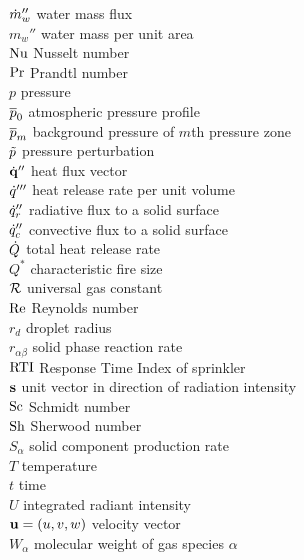\documentclass[11pt]{book}
\begin{document}
\begin{tabbing}
$\dot{m}_w''$                 \> water mass flux  \\
$m_w''$                   \> water mass per unit area \\
$\hbox{Nu}$                     \> Nusselt number \\
$\hbox{Pr}$                     \> Prandtl number \\
$p$                       \> pressure \\
$\overline{p}_0$                   \> atmospheric pressure profile \\
$\overline{p}_m$                   \> background pressure of $m$th pressure zone \\
$\tilde{p}$                     \> pressure perturbation \\
$\dot{\bf q}''$                  \> heat flux vector \\
$\dot{q}'''$                  \> heat release rate per unit volume \\
$\dot{q}_r''$                 \> radiative flux to a solid surface \\
$\dot{q}_c''$                 \> convective flux to a solid surface \\
$\dot{Q}$                     \> total heat release rate \\
$Q^*$                     \> characteristic fire size \\
${\cal R}$                      \> universal gas constant \\
$\hbox{Re}$                     \> Reynolds number \\
$r_d$                     \> droplet radius \\
$r_{\alpha\beta}$     \> solid phase reaction rate \\
$\hbox{RTI}$              \> Response Time Index of sprinkler \\
${\bf s}$                     \> unit vector in direction of radiation intensity\\
$\hbox{Sc}$                     \> Schmidt number \\
$\hbox{Sh}$                     \> Sherwood number \\
$S_\alpha$        \> solid component production rate \\
$T$                       \> temperature \\
$t$                       \> time           \\
$U$                       \> integrated radiant intensity \\
${\bf u}=(u,v,w)$             \> velocity vector  \\
$W_\alpha$                \> molecular weight of gas species $\alpha$ \\

\end{tabbing}
\end{document}
